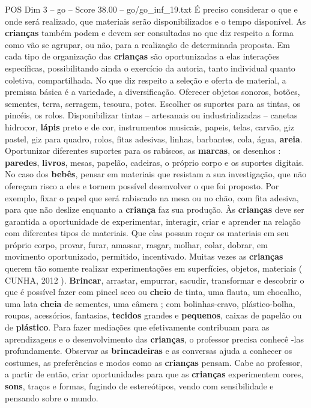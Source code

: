 \begin{textsample}{POS Dim 3 – go – Score 38.00 – go/go\_inf\_19.txt}
É preciso considerar o que e onde será realizado, que materiais serão disponibilizados e o tempo disponível.
As \textbf{crianças} também podem e devem ser consultadas no que diz respeito a forma como vão se agrupar, ou não, para a realização de determinada proposta.
Em cada tipo de organização das \textbf{crianças} são oportunizadas a elas interações específicas, possibilitando ainda o exercício da autoria, tanto individual quanto coletiva, compartilhada.
No que diz respeito a seleção e oferta de material, a premissa básica é a variedade, a diversificação.
Oferecer objetos sonoros, botões, sementes, terra, serragem, tesoura, potes.
Escolher os suportes para as tintas, os pincéis, os rolos.
Disponibilizar tintas – artesanais ou industrializadas – canetas hidrocor, \textbf{lápis} preto e de cor, instrumentos musicais, papeis, telas, carvão, giz pastel, giz para quadro, rolos, fitas adesivas, linhas, barbantes, cola, água, \textbf{areia}.
Oportunizar diferentes suportes para os rabiscos, as \textbf{marcas}, os desenhos : \textbf{paredes}, \textbf{livros}, mesas, papelão, cadeiras, o próprio corpo e os suportes digitais.
No caso dos \textbf{bebês}, pensar em materiais que resistam a sua investigação, que não ofereçam risco a eles e tornem possível desenvolver o que foi proposto.
Por exemplo, fixar o papel que será rabiscado na mesa ou no chão, com fita adesiva, para que não deslize enquanto a \textbf{criança} faz sua produção.
Às \textbf{crianças} deve ser garantida a oportunidade de experimentar, interagir, criar e aprender na relação com diferentes tipos de materiais.
Que elas possam roçar os materiais em seu próprio corpo, provar, furar, amassar, rasgar, molhar, colar, dobrar, em movimento oportunizado, permitido, incentivado.
Muitas vezes as \textbf{crianças} querem tão somente realizar experimentações em superfícies, objetos, materiais ( CUNHA, 2012 ). \textbf{Brincar}, arrastar, empurrar, sacudir, transformar e descobrir o que é possível fazer com pincel seco ou \textbf{cheio} de tinta, uma flauta, um chocalho, uma lata \textbf{cheia} de sementes, uma câmera ; com bolinhas-cravo, plástico-bolha, roupas, acessórios, fantasias, \textbf{tecidos} grandes e \textbf{pequenos}, caixas de papelão ou de \textbf{plástico}.
Para fazer mediações que efetivamente contribuam para as aprendizagens e o desenvolvimento das \textbf{crianças}, o professor precisa conhecê -las profundamente.
Observar as \textbf{brincadeiras} e as conversas ajuda a conhecer os costumes, as preferências e modos como as \textbf{crianças} pensam.
Cabe ao professor, a partir de então, criar oportunidades para que as \textbf{crianças} experimentem cores, \textbf{sons}, traços e formas, fugindo de estereótipos, vendo com sensibilidade e pensando sobre o mundo.

\end{textsample}
